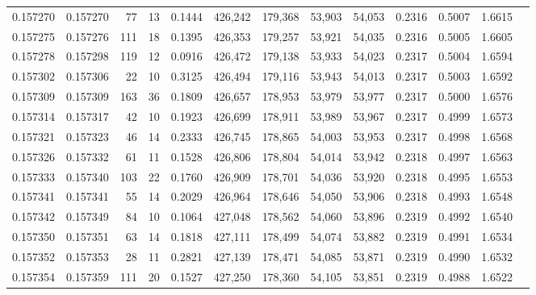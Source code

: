 \begin{tabular}{rrrrrrrrrrrrr}
0.157270 & 0.157270 &    77 &  13 &                                     0.1444 & 426,242 & 179,368 &  53,903 &  54,053 & 0.2316 & 0.5007 & 1.6615 \\
0.157275 & 0.157276 &   111 &  18 &                                     0.1395 & 426,353 & 179,257 &  53,921 &  54,035 & 0.2316 & 0.5005 & 1.6605 \\
0.157278 & 0.157298 &   119 &  12 &                                     0.0916 & 426,472 & 179,138 &  53,933 &  54,023 & 0.2317 & 0.5004 & 1.6594 \\
0.157302 & 0.157306 &    22 &  10 &                                     0.3125 & 426,494 & 179,116 &  53,943 &  54,013 & 0.2317 & 0.5003 & 1.6592 \\
0.157309 & 0.157309 &   163 &  36 &                                     0.1809 & 426,657 & 178,953 &  53,979 &  53,977 & 0.2317 & 0.5000 & 1.6576 \\
0.157314 & 0.157317 &    42 &  10 &                                     0.1923 & 426,699 & 178,911 &  53,989 &  53,967 & 0.2317 & 0.4999 & 1.6573 \\
0.157321 & 0.157323 &    46 &  14 &                                     0.2333 & 426,745 & 178,865 &  54,003 &  53,953 & 0.2317 & 0.4998 & 1.6568 \\
0.157326 & 0.157332 &    61 &  11 &                                     0.1528 & 426,806 & 178,804 &  54,014 &  53,942 & 0.2318 & 0.4997 & 1.6563 \\
0.157333 & 0.157340 &   103 &  22 &                                     0.1760 & 426,909 & 178,701 &  54,036 &  53,920 & 0.2318 & 0.4995 & 1.6553 \\
0.157341 & 0.157341 &    55 &  14 &                                     0.2029 & 426,964 & 178,646 &  54,050 &  53,906 & 0.2318 & 0.4993 & 1.6548 \\
0.157342 & 0.157349 &    84 &  10 &                                     0.1064 & 427,048 & 178,562 &  54,060 &  53,896 & 0.2319 & 0.4992 & 1.6540 \\
0.157350 & 0.157351 &    63 &  14 &                                     0.1818 & 427,111 & 178,499 &  54,074 &  53,882 & 0.2319 & 0.4991 & 1.6534 \\
0.157352 & 0.157353 &    28 &  11 &                                     0.2821 & 427,139 & 178,471 &  54,085 &  53,871 & 0.2319 & 0.4990 & 1.6532 \\
0.157354 & 0.157359 &   111 &  20 &                                     0.1527 & 427,250 & 178,360 &  54,105 &  53,851 & 0.2319 & 0.4988 & 1.6522 \\

\end{tabular}
